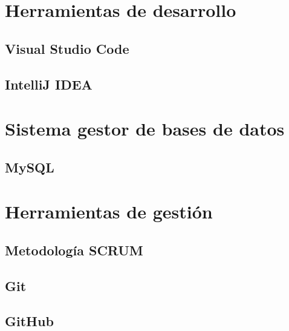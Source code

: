 
\section{Herramientas de desarrollo}


\subsection{Visual Studio Code}


\subsection{IntelliJ IDEA}


\section{Sistema gestor de bases de datos}


\subsection{MySQL}


\section{Herramientas de gestión}


\subsection{Metodología SCRUM}


\subsection{Git}


\subsection{GitHub}


